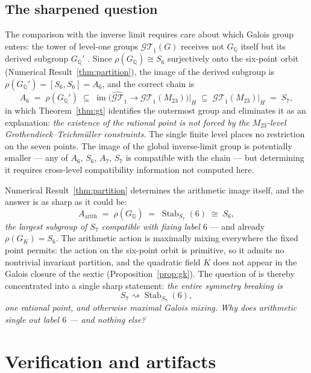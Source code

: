 \documentclass[11pt]{amsart}
\newcommand{\QQ}{\mathbb{Q}}
\newcommand{\GK}{G_{K}}
\newcommand{\Mtw}{M_{23}}
\theoremstyle{plain}
\theoremstyle{definition}
\begin{document}
\subsection*{The sharpened question}
The comparison with the inverse limit requires care about which
Galois group enters: the tower of level-one groups
$\mathcal{GT}_1(G)$ receives not $G_\QQ$ itself but its derived
subgroup $G_\QQ'$ \cite{Guillot}. Since
$\rho(G_\QQ)\cong S_6$ surjectively onto the six-point orbit
(Numerical Result~\ref{thm:partition}), the image of the derived
subgroup is $\rho(G_\QQ')=[S_6,S_6]=A_6$, and the correct chain is
\[
  A_6\;=\;\rho(G_\QQ')
  \;\subseteq\;
  \operatorname{im}\bigl(\widehat{\mathcal{GT}}_1\to
  \mathcal{GT}_1(\Mtw)\bigr)\Big|_{H}
  \;\subseteq\;
  \mathcal{GT}_1(\Mtw)\Big|_{H}\;=\;S_7 ,
\]
in which Theorem~\ref{thm:gt} identifies the outermost group and
eliminates it as an explanation: \emph{the existence of the rational
point is not forced by the $\Mtw$-level Grothendieck--Teichm\"uller
constraints}. The single finite level places no restriction on the
seven points. The image of the global inverse-limit group is
potentially smaller --- any of $A_6$, $S_6$, $A_7$, $S_7$ is
compatible with the chain --- but determining it requires
cross-level compatibility information not computed here.

Numerical Result~\ref{thm:partition} determines the arithmetic image
itself, and the answer is as sharp as it could be:
\[
  A_{\mathrm{arith}}\;=\;\rho(G_\QQ)\;=\;
  \operatorname{Stab}_{S_7}(6)\;\cong\;S_6 ,
\]
\emph{the largest subgroup of $S_7$ compatible with fixing label
$6$} --- and already $\rho(\GK)=S_6$. The arithmetic action is
maximally mixing everywhere the fixed point permits: the action on
the six-point orbit is primitive, so it admits no nontrivial
invariant partition, and the quadratic field $K$ does not appear in
the Galois closure of the sextic
(Proposition~\ref{prop:gk}). The question of \cite{HJLPPZ} is
thereby concentrated into a single sharp statement: \emph{the entire
symmetry breaking is
\[
  S_7 \rightsquigarrow \operatorname{Stab}_{S_7}(6),
\]
one rational point, and otherwise maximal Galois mixing. Why does
arithmetic single out label $6$ --- and nothing else?}

\section{Verification and artifacts}\label{sec:artifacts}
\end{document}
